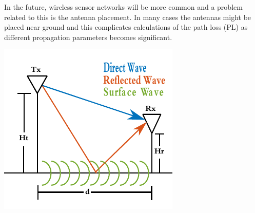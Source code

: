 \large


In the future, wireless sensor networks will be more common and a problem related to this is the antenna placement. In many cases the antennas might be placed near ground and this complicates calculations of the path loss (PL) as different propagation parameters becomes significant. 

\begin{center}
\includegraphics[scale=1.2]{pix/poster_cropped_1.pdf}
\end{center}
